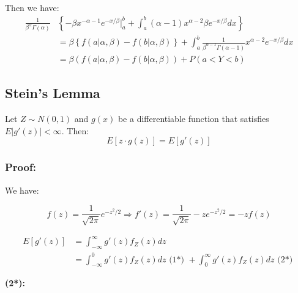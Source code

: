 \documentclass{article}
\begin{document}
\begin{enumerate}
    Then we have:
    \begin{equation*}
        \begin{split}
            \frac{1}{\beta^\alpha \Gamma(\alpha)} &\left\{ -\beta x^{-\alpha-1}e^{-x/\beta}\Biggr|_{a}^b + \int_a^b (\alpha-1) x^{\alpha-2} \beta e^{-x/\beta} dx \right\}\\
            &= \beta \left\{ f(a|\alpha,\beta) - f(b|\alpha,\beta) \right\} + \int_a^b \frac{1}{\beta^{\alpha-1}\Gamma(\alpha-1)} x^{\alpha-2}e^{-x/\beta}dx\\
            &= \beta\left(f(a|\alpha,\beta) - f(b|\alpha,\beta) \right) + P(a< Y < b)
        \end{split}
    \end{equation*}
\end{enumerate}

\subsection{Stein's Lemma}

Let $Z \sim N(0,1)$ and $g(x)$ be a differentiable function that satisfies $E|g'(z)| < \infty$. Then:
\begin{equation*}
    E[z\cdot g(z)] = E[g'(z)]
\end{equation*}

\subsubsection*{Proof:}

We have:

\begin{equation*}
    f(z) = \frac{1}{\sqrt{2\pi}} e^{-z^2/2} \Rightarrow f'(z) = \frac{1}{\sqrt{2\pi}} - z e^{-z^2/2} = -z f(z)
\end{equation*}

\begin{equation*}
    \begin{split}
        E[g'(z)] &= \int_{-\infty}^\infty g'(z) f_Z(z) dz\\
        &= \int_{-\infty}^0 g'(z)f_Z(z) dz \text{ (1*) } + \int_0^\infty g'(z)f_Z(z)dz \text{ (2*) }
    \end{split}
\end{equation*}

\noindent \textbf{(2*):}
\end{document}

